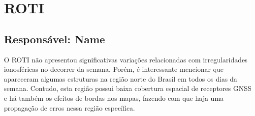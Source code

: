 \documentclass[a4paper, 10pt]{article}
\begin{document}
 \section{ROTI} 
 \subsection{Responsável: Name} 
 
O ROTI não apresentou significativas variações relacionadas com irregularidades ionosféricas no decorrer da semana. Porém, é interessante mencionar que apareceram algumas estruturas na região norte do Brasil em todos os dias da semana. Contudo, esta região possui baixa cobertura espacial de receptores GNSS e há também os efeitos de bordas nos mapas, fazendo com que haja uma propagação de erros nessa região específica.
\end{document}
